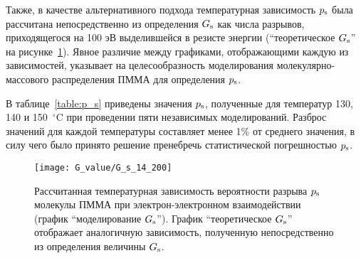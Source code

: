 Также, в качестве альтернативного подхода температурная зависимость $p_\mathrm{s}$ была рассчитана непосредственно из определения $G_\mathrm{s}$ как числа разрывов, приходящегося на 100 эВ выделившейся в резисте энергии (``теоретическое $G_\mathrm{s}$'' на рисунке~\ref{fig:P_s}).
Явное различие между графиками, отображающими каждую из зависимостей, указывает на целесообразность моделирования молекулярно-массового распределения ПММА для определения $p_\mathrm{s}$.

В таблице~\ref{table:p_s} приведены значения $p_\mathrm{s}$, полученные для температур 130, 140 и 150~$^\circ$C при проведении пяти независимых моделирований.
Разброс значений для каждой температуры составляет менее 1\% от среднего значения, в силу чего было принято решение пренебречь статистической погрешностью $p_\mathrm{s}$.

\begin{figure}[h]
	\centering
	\texttt{[image: G\_value/G\_s\_14\_200]}
	\caption{Рассчитанная температурная зависимость вероятности разрыва $p_\mathrm{s}$ молекулы ПММА при электрон-электронном взаимодействии (график ``моделирование $G_\mathrm{s}$''). График ``теоретическое $G_\mathrm{s}$'' отображает аналогичную зависимость, полученную непосредственно из определения величины $G_\mathrm{s}$.\vspace{1.5em}}
	\label{fig:P_s}
\end{figure}

